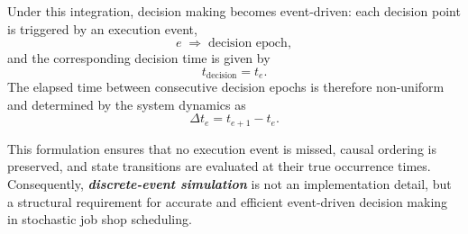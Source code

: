 Under this integration, decision making becomes event-driven: each decision point is triggered by an execution event,
\begin{equation}
e \;\Rightarrow\; \text{decision epoch},
\label{eq:decision_epoch_event}
\end{equation}
and the corresponding decision time is given by
\begin{equation}
t_{\text{decision}} = t_e.
\label{eq:decision_time_event}
\end{equation}
The elapsed time between consecutive decision epochs is therefore non-uniform and determined by the system dynamics as
\begin{equation}
\Delta t_e = t_{e+1} - t_e.
\label{eq:delta_te}
\end{equation}

This formulation ensures that no execution event is missed, causal ordering is preserved, and state transitions are evaluated at their true occurrence times. Consequently, \textbf{\emph{discrete-event simulation}} is not an implementation detail, but a structural requirement for accurate and efficient event-driven decision making in stochastic job shop scheduling.
